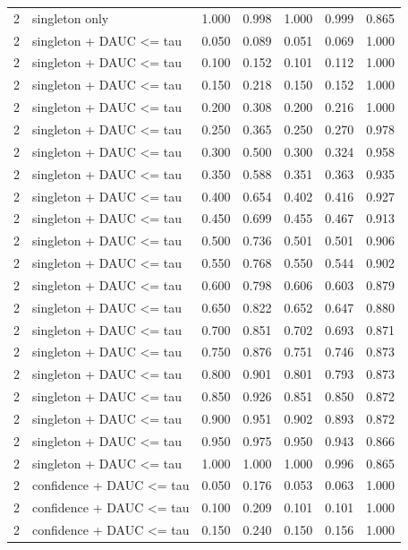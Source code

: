 \begin{tabular}{rlrrrrr}
2 & singleton only & 1.000 & 0.998 & 1.000 & 0.999 & 0.865 \\
2 & singleton + DAUC <= tau & 0.050 & 0.089 & 0.051 & 0.069 & 1.000 \\
2 & singleton + DAUC <= tau & 0.100 & 0.152 & 0.101 & 0.112 & 1.000 \\
2 & singleton + DAUC <= tau & 0.150 & 0.218 & 0.150 & 0.152 & 1.000 \\
2 & singleton + DAUC <= tau & 0.200 & 0.308 & 0.200 & 0.216 & 1.000 \\
2 & singleton + DAUC <= tau & 0.250 & 0.365 & 0.250 & 0.270 & 0.978 \\
2 & singleton + DAUC <= tau & 0.300 & 0.500 & 0.300 & 0.324 & 0.958 \\
2 & singleton + DAUC <= tau & 0.350 & 0.588 & 0.351 & 0.363 & 0.935 \\
2 & singleton + DAUC <= tau & 0.400 & 0.654 & 0.402 & 0.416 & 0.927 \\
2 & singleton + DAUC <= tau & 0.450 & 0.699 & 0.455 & 0.467 & 0.913 \\
2 & singleton + DAUC <= tau & 0.500 & 0.736 & 0.501 & 0.501 & 0.906 \\
2 & singleton + DAUC <= tau & 0.550 & 0.768 & 0.550 & 0.544 & 0.902 \\
2 & singleton + DAUC <= tau & 0.600 & 0.798 & 0.606 & 0.603 & 0.879 \\
2 & singleton + DAUC <= tau & 0.650 & 0.822 & 0.652 & 0.647 & 0.880 \\
2 & singleton + DAUC <= tau & 0.700 & 0.851 & 0.702 & 0.693 & 0.871 \\
2 & singleton + DAUC <= tau & 0.750 & 0.876 & 0.751 & 0.746 & 0.873 \\
2 & singleton + DAUC <= tau & 0.800 & 0.901 & 0.801 & 0.793 & 0.873 \\
2 & singleton + DAUC <= tau & 0.850 & 0.926 & 0.851 & 0.850 & 0.872 \\
2 & singleton + DAUC <= tau & 0.900 & 0.951 & 0.902 & 0.893 & 0.872 \\
2 & singleton + DAUC <= tau & 0.950 & 0.975 & 0.950 & 0.943 & 0.866 \\
2 & singleton + DAUC <= tau & 1.000 & 1.000 & 1.000 & 0.996 & 0.865 \\
2 & confidence + DAUC <= tau & 0.050 & 0.176 & 0.053 & 0.063 & 1.000 \\
2 & confidence + DAUC <= tau & 0.100 & 0.209 & 0.101 & 0.101 & 1.000 \\
2 & confidence + DAUC <= tau & 0.150 & 0.240 & 0.150 & 0.156 & 1.000 \\

\end{tabular}
